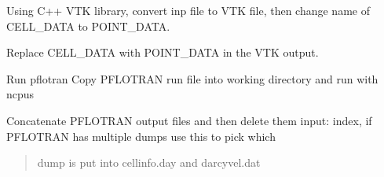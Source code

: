 \documentclass[letterpaper,10pt,english]{sphinxmanual}
\begin{document}

\begin{fulllineitems}
\label{\detokenize{pydfnworks:pydfnworks.flow.parse_pflotran_vtk}}
Using C++ VTK library, convert inp file to VTK file, then change name of CELL\_DATA to POINT\_DATA.

\end{fulllineitems}


\begin{fulllineitems}
\label{\detokenize{pydfnworks:pydfnworks.flow.parse_pflotran_vtk_python}}
Replace CELL\_DATA with POINT\_DATA in the VTK output.

\end{fulllineitems}


\begin{fulllineitems}
\label{\detokenize{pydfnworks:pydfnworks.flow.pflotran}}
Run pflotran
Copy PFLOTRAN run file into working directory and run with ncpus

\end{fulllineitems}


\begin{fulllineitems}
\label{\detokenize{pydfnworks:pydfnworks.flow.pflotran_cleanup}}
Concatenate PFLOTRAN output files and then delete them 
input: index, if PFLOTRAN has multiple dumps use this to pick which
\begin{quote}

dump is put into cellinfo.day and darcyvel.dat
\end{quote}

\end{fulllineitems}

\end{document}
